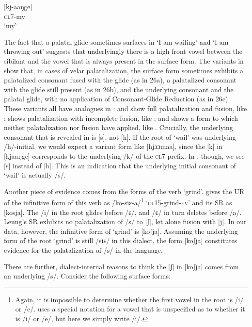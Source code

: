 \documentclass[output=paper]{langsci/langscibook}
\begin{document}
\ex\label{ex:glewwe:26c}{}
 [kj-aaŋge]\\{}
\textsc{cl7}-my\\{}
\glt ‘my’
\z
\z 

The fact that a palatal glide sometimes surfaces in ‘I am wailing’ and ‘I am throwing out’ suggests that underlyingly there is a high front vowel between the sibilant and the vowel that is always present in the surface form. The variants in  show that, in cases of velar palatalization, the surface form sometimes exhibits a palatalized consonant fused with the glide (as in 26a), a palatalized consonant with the glide still present (as in 26b), and the underlying consonant and the palatal glide, with no application of Consonant-Glide Reduction (as in 26c). These variants all have analogues in :  and  show full palatalization and fusion, like ;  shows palatalization with incomplete fusion, like ; and  shows a form to which neither palatalization nor fusion have applied, like . Crucially, the underlying consonant that is revealed in  is [s], not [h]. If the root of ‘wail’ was underlying /h/-initial, we would expect a variant form like [hjɔɔmaa], since the [k] in [kjaaŋge] corresponds to the underlying /k/ of the \textsc{cl}7 prefix. In , though, we see [s] instead of [h]. This is an indication that the underlying initial consonant of ‘wail’ is actually /s/. 

Another piece of evidence comes from the forms of the verb ‘grind’. \citet{Leung1991} gives the UR of the infinitive form of this verb as /ko-siɛ-a/\footnote{Again, it is impossible to determine whether the first vowel in the root is /i/ or /e/. \citet{Leung1991} uses a special notation for a vowel that is unspecified as to whether it is /i/ or /e/, but here we simply write /i/.}  ‘\textsc{cl}15-grind-\textsc{fv}’ and its SR as [kosja]. The /i/ in the root glides before /ɛ/, and /ɛ/ in turn deletes before /a/. Leung’s SR exhibits no palatalization of /s/ to [ʃ], let alone fusion with [j]. In our data, however, the infinitive form of ‘grind’ is [koʃja]. Assuming the underlying form of the root ‘grind’ is still /siɛ/ in this dialect, the form [koʃja] constitutes evidence for the palatalization of /s/ in the language. 

There are further, dialect-internal reasons to think the [ʃ] in [koʃja] comes from an underlying /s/. Consider the following surface forms:
\end{document}
